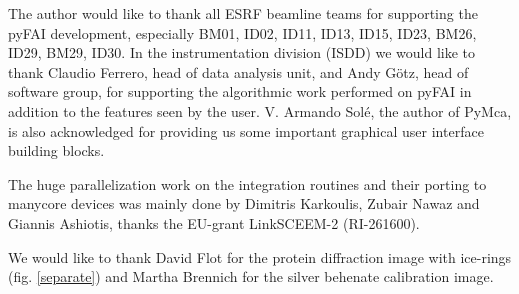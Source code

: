 \documentclass[preprint]{iucr}
\begin{document}
The author would like to thank all ESRF beamline teams for supporting the
pyFAI development, especially BM01, ID02, ID11, ID13, ID15, ID23, BM26, ID29, BM29,
ID30. In the instrumentation division (ISDD) we would like to thank Claudio
Ferrero, head of data analysis unit, and Andy G\"otz, head of software group, for
supporting the algorithmic work performed on pyFAI in addition to the features
seen by the user.
V. Armando Solé, the author of PyMca, is also acknowledged for providing us some
important graphical user interface building blocks.
  
The huge parallelization work on the integration routines and their porting to
manycore devices was mainly done by Dimitris Karkoulis, Zubair Nawaz and Giannis Ashiotis,
thanks the EU-grant LinkSCEEM-2 (RI-261600).

We would like to thank David Flot for the protein
diffraction image with ice-rings (fig. \ref{separate}) and Martha Brennich for
the silver behenate calibration image.
\end{document}
